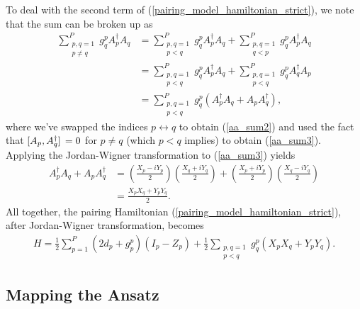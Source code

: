 \documentclass[10pt]{article}
\begin{document}
To deal with the second term of (\ref{pairing_model_hamiltonian_strict}), we note that the sum can be broken up as
\begin{align}
\sum_{\substack{p,q=1 \\ p\neq q}}^Pg^p_qA^\dagger_pA_q
&=
\sum_{\substack{p,q=1 \\ p<q}}^Pg^p_qA^\dagger_pA_q
+
\sum_{\substack{p,q=1 \\ q<p}}^Pg^p_qA^\dagger_pA_q
\\
\label{aa_sum2}
&=
\sum_{\substack{p,q=1 \\ p<q}}^Pg^p_qA^\dagger_pA_q
+
\sum_{\substack{p,q=1 \\ p<q}}^Pg^p_qA^\dagger_qA_p
\\
\label{aa_sum3}
&=
\sum_{\substack{p,q=1 \\ p<q}}^Pg^p_q(A^\dagger_pA_q+A_pA^\dagger_q)
,\end{align}
where we've swapped the indices $p\leftrightarrow q$ to obtain (\ref{aa_sum2}) and used the fact that $\comm*{A_p}{A^\dagger_q}=0$ for $p\neq q$ (which $p<q$ implies) to obtain (\ref{aa_sum3}). Applying the Jordan-Wigner transformation to (\ref{aa_sum3}) yields
\begin{align}
A^\dagger_pA_q+A_pA^\dagger_q
&=
\left(\frac{X_p-iY_p}{2}\right)\left(\frac{X_q+iY_q}{2}\right)
+
\left(\frac{X_p+iY_p}{2}\right)\left(\frac{X_q-iY_q}{2}\right)
\\
&=
\frac{X_pX_q+Y_pY_q}{2}.
\end{align}
All together, the pairing Hamiltonian (\ref{pairing_model_hamiltonian_strict}), after Jordan-Wigner transformation, becomes
\begin{align}
\label{pairing_model_hamiltonian_mapped}
H
=
\frac{1}{2}\sum_{p=1}^P(2d_p+g^p_p)(I_p-Z_p)
+
\frac{1}{2}\sum_{\substack{p,q=1 \\ p<q}}g^p_q(X_pX_q+Y_pY_q).
\end{align}

\subsection{Mapping the Ansatz}
\end{document}
